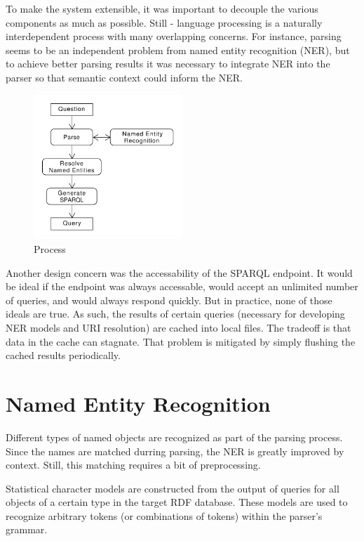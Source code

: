 \documentclass[11pt]{article}
\begin{document}
To make the system extensible, it was important to decouple the various
components as much as possible. Still - language processing is a naturally
interdependent process with many overlapping concerns. For instance,
parsing seems to be an independent problem from named entity recognition (NER),
but to achieve better parsing results it was necessary to integrate NER into the
parser so that semantic context could inform the NER. 

\begin{figure}[h!]
    \centering
    \includegraphics[width=0.5\textwidth,natwidth=1,natheight=1]{usage.pdf}
    \caption{Process}
    \label{fig:process}
\end{figure}

Another design concern was the accessability of the SPARQL endpoint.
It would be ideal if the endpoint was always accessable, would accept an unlimited
number of queries, and would always respond quickly. But in practice, none of
those ideals are true. As such, the results of certain queries
(necessary for developing NER models and URI resolution) are cached into local files.
The tradeoff is that data in the cache can stagnate. That problem is mitigated by 
simply flushing the cached results periodically.

\section{Named Entity Recognition}
Different types of named objects are recognized as part of the parsing process.
Since the names are matched durring parsing, the NER is greatly improved by context.
Still, this matching requires a bit of preprocessing.

Statistical character models are constructed from the output of queries for all 
objects of a certain type in the target RDF database. 
These models are used to recognize arbitrary tokens (or combinations of 
tokens) within the parser's grammar. 
\end{document}
